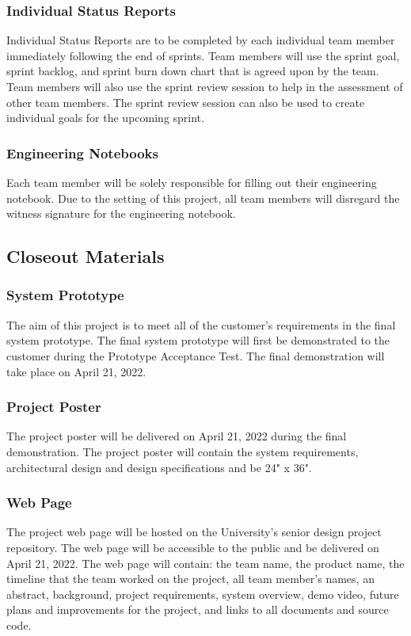 \subsubsection{Individual Status Reports}
Individual Status Reports are to be completed by each individual team member immediately following the end of sprints. Team members will use the sprint goal, sprint backlog, and sprint burn down chart that is agreed upon by the team. Team members will also use the sprint review session to help in the assessment of other team members. The sprint review session can also be used to create individual goals for the upcoming sprint. 

\subsubsection{Engineering Notebooks}
Each team member will be solely responsible for filling out their engineering notebook. Due to the setting of this project, all team members will disregard the witness signature for the engineering notebook.

\subsection{Closeout Materials}
\subsubsection{System Prototype}
The aim of this project is to meet all of the customer's requirements in the final system prototype. The final system prototype will first be demonstrated to the customer during the Prototype Acceptance Test. The final demonstration will take place on April 21, 2022.

\subsubsection{Project Poster}
The project poster will be delivered on April 21, 2022 during the final demonstration. The project poster will contain the system requirements, architectural design and design specifications and be 24" x 36". 

\subsubsection{Web Page}
The project web page will be hosted on the University's senior design project repository. The web page will be accessible to the public and be delivered on April 21, 2022. The web page will contain: the team name, the product name, the timeline that the team worked on the project, all team member's names, an abstract, background, project requirements, system overview, demo video, future plans and improvements for the project, and links to all documents and source code. 

